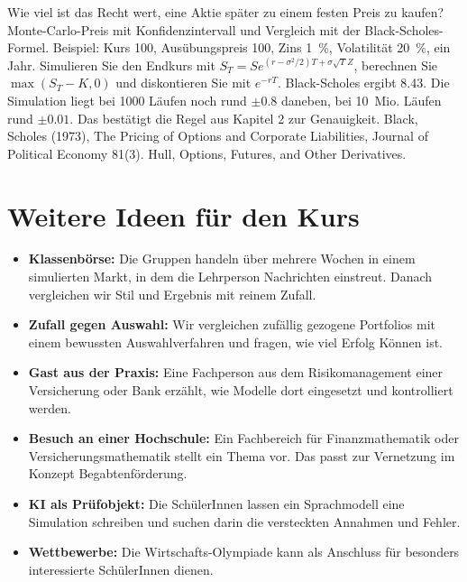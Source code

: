 {Wie viel ist das Recht wert, eine Aktie später zu einem festen Preis zu kaufen?}
{Monte-Carlo-Preis mit Konfidenzintervall und Vergleich mit der Black-Scholes-Formel.}
{Beispiel: Kurs 100, Ausübungspreis 100, Zins 1~\%, Volatilität 20~\%, ein Jahr. Simulieren Sie den Endkurs mit $S_T = S e^{(r-\sigma^2/2)T + \sigma\sqrt{T}Z}$, berechnen Sie $\max(S_T - K, 0)$ und diskontieren Sie mit $e^{-rT}$.}
{Black-Scholes ergibt 8.43. Die Simulation liegt bei 1000 Läufen noch rund $\pm 0.8$ daneben, bei 10~Mio. Läufen rund $\pm 0.01$. Das bestätigt die Regel aus Kapitel 2 zur Genauigkeit.}
{Black, Scholes (1973), The Pricing of Options and Corporate Liabilities, Journal of Political Economy 81(3). Hull, Options, Futures, and Other Derivatives.}

\section{Weitere Ideen für den Kurs}
\begin{itemize}
	\item \textbf{Klassenbörse:} Die Gruppen handeln über mehrere Wochen in einem simulierten Markt, in dem die Lehrperson Nachrichten einstreut. Danach vergleichen wir Stil und Ergebnis mit reinem Zufall.
	\item \textbf{Zufall gegen Auswahl:} Wir vergleichen zufällig gezogene Portfolios mit einem bewussten Auswahlverfahren und fragen, wie viel Erfolg Können ist.
	\item \textbf{Gast aus der Praxis:} Eine Fachperson aus dem Risikomanagement einer Versicherung oder Bank erzählt, wie Modelle dort eingesetzt und kontrolliert werden.
	\item \textbf{Besuch an einer Hochschule:} Ein Fachbereich für Finanzmathematik oder Versicherungsmathematik stellt ein Thema vor. Das passt zur Vernetzung im Konzept Begabtenförderung.
	\item \textbf{KI als Prüfobjekt:} Die SchülerInnen lassen ein Sprachmodell eine Simulation schreiben und suchen darin die versteckten Annahmen und Fehler.
	\item \textbf{Wettbewerbe:} Die Wirtschafts-Olympiade kann als Anschluss für besonders interessierte SchülerInnen dienen.
\end{itemize}
